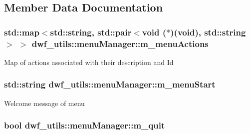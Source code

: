 \subsection{\-Member \-Data \-Documentation}
\hypertarget{classdwf__utils_1_1menu_manager_ae8707504317fb8fb0e970a3fe59e2b07}{
\subsubsection[{m\-\_\-menu\-Actions}]{\setlength{\rightskip}{0pt plus 5cm}std\-::map$<$std\-::string, std\-::pair$<$void ($\ast$)(void), std\-::string$>$ $>$ {\bf dwf\-\_\-utils\-::menu\-Manager\-::m\-\_\-menu\-Actions}}}\label{classdwf__utils_1_1menu_manager_ae8707504317fb8fb0e970a3fe59e2b07}
\-Map of actions associated with their description and \-Id \hypertarget{classdwf__utils_1_1menu_manager_ad5bf586a25449c2fb4ebba6dd36b9d43}{
\subsubsection[{m\-\_\-menu\-Start}]{\setlength{\rightskip}{0pt plus 5cm}std\-::string {\bf dwf\-\_\-utils\-::menu\-Manager\-::m\-\_\-menu\-Start}}}\label{classdwf__utils_1_1menu_manager_ad5bf586a25449c2fb4ebba6dd36b9d43}
\-Welcome message of menu \hypertarget{classdwf__utils_1_1menu_manager_a1ca50905e47677b7fa6fd523cc161961}{
\subsubsection[{m\-\_\-quit}]{\setlength{\rightskip}{0pt plus 5cm}bool {\bf dwf\-\_\-utils\-::menu\-Manager\-::m\-\_\-quit}}}\label{classdwf__utils_1_1menu_manager_a1ca50905e47677b7fa6fd523cc161961}
